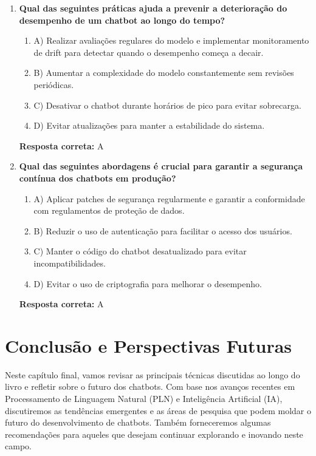 \documentclass[14pt,a4paper,oneside]{book}
\begin{document}
\begin{enumerate}
	\item \textbf{Qual das seguintes práticas ajuda a prevenir a deterioração do desempenho de um chatbot ao longo do tempo?}
	\begin{enumerate}[label=\alph*)]
		\item A) Realizar avaliações regulares do modelo e implementar monitoramento de drift para detectar quando o desempenho começa a decair.
		\item B) Aumentar a complexidade do modelo constantemente sem revisões periódicas.
		\item C) Desativar o chatbot durante horários de pico para evitar sobrecarga.
		\item D) Evitar atualizações para manter a estabilidade do sistema.
	\end{enumerate}
	\vspace{5mm}
	\textbf{Resposta correta:} A
	
	\item \textbf{Qual das seguintes abordagens é crucial para garantir a segurança contínua dos chatbots em produção?}
	\begin{enumerate}[label=\alph*)]
		\item A) Aplicar patches de segurança regularmente e garantir a conformidade com regulamentos de proteção de dados.
		\item B) Reduzir o uso de autenticação para facilitar o acesso dos usuários.
		\item C) Manter o código do chatbot desatualizado para evitar incompatibilidades.
		\item D) Evitar o uso de criptografia para melhorar o desempenho.
	\end{enumerate}
	\vspace{5mm}
	\textbf{Resposta correta:} A
	
\end{enumerate}


\chapter{Conclusão e Perspectivas Futuras}

Neste capítulo final, vamos revisar as principais técnicas discutidas ao longo do livro e refletir sobre o futuro dos chatbots. Com base nos avanços recentes em Processamento de Linguagem Natural (PLN) e Inteligência Artificial (IA), discutiremos as tendências emergentes e as áreas de pesquisa que podem moldar o futuro do desenvolvimento de chatbots. Também forneceremos algumas recomendações para aqueles que desejam continuar explorando e inovando neste campo.
\end{document}

